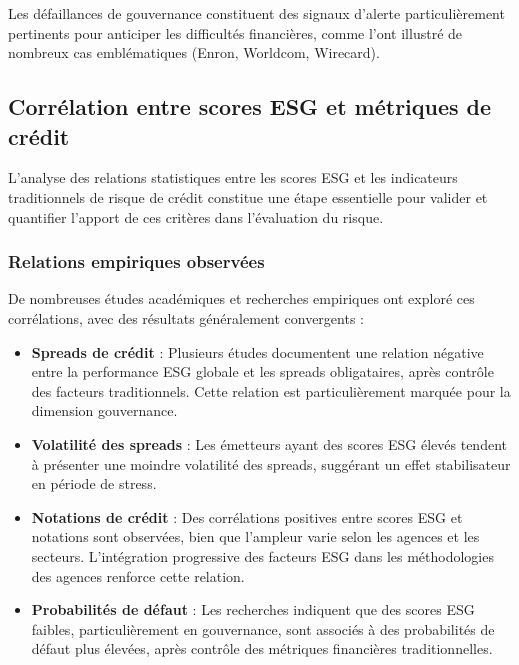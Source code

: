 Les défaillances de gouvernance constituent des signaux d'alerte particulièrement pertinents pour anticiper les difficultés financières, comme l'ont illustré de nombreux cas emblématiques (Enron, Worldcom, Wirecard).

\subsection{Corrélation entre scores ESG et métriques de crédit}

L'analyse des relations statistiques entre les scores ESG et les indicateurs traditionnels de risque de crédit constitue une étape essentielle pour valider et quantifier l'apport de ces critères dans l'évaluation du risque.

\subsubsection{Relations empiriques observées}

De nombreuses études académiques et recherches empiriques ont exploré ces corrélations, avec des résultats généralement convergents :

\begin{itemize}
    \item \textbf{Spreads de crédit} : Plusieurs études documentent une relation négative entre la performance ESG globale et les spreads obligataires, après contrôle des facteurs traditionnels. Cette relation est particulièrement marquée pour la dimension gouvernance.
    
    \item \textbf{Volatilité des spreads} : Les émetteurs ayant des scores ESG élevés tendent à présenter une moindre volatilité des spreads, suggérant un effet stabilisateur en période de stress.
    
    \item \textbf{Notations de crédit} : Des corrélations positives entre scores ESG et notations sont observées, bien que l'ampleur varie selon les agences et les secteurs. L'intégration progressive des facteurs ESG dans les méthodologies des agences renforce cette relation.
    
    \item \textbf{Probabilités de défaut} : Les recherches indiquent que des scores ESG faibles, particulièrement en gouvernance, sont associés à des probabilités de défaut plus élevées, après contrôle des métriques financières traditionnelles.
\end{itemize}

